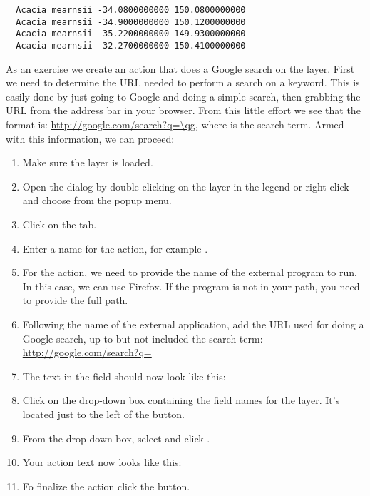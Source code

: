 \begin{verbatim}
  Acacia mearnsii -34.0800000000 150.0800000000
  Acacia mearnsii -34.9000000000 150.1200000000
  Acacia mearnsii -35.2200000000 149.9300000000
  Acacia mearnsii -32.2700000000 150.4100000000
\end{verbatim} 

As an exercise we create an action that does a Google search on the 
 layer. First we need to determine the URL needed to perform a search on a
keyword. This is easily done by just going to Google and doing a simple
search, then grabbing the URL from the address bar in your browser. From this
little effort we see that the format is: \url{http://google.com/search?q=\qg},
where \usertext{\qg} is the search term. Armed with this information, we can
proceed:

\begin{enumerate}
\item Make sure the  layer is loaded.
\item Open the  dialog by double-clicking on the layer in the
  legend or right-click and choose  from the popup menu.
\item Click on the  tab.
\item Enter a name for the action, for example .
\item For the action, we need to provide the name of the external program to
  run. In this case, we can use Firefox. If the program is not in
  your path, you need to provide the full path.
\item Following the name of the external application, add the URL used for
  doing a Google search, up to but not included the search term:
  \url{http://google.com/search?q=}
\item The text in the  field should now look like this:\\
\item Click on the drop-down box containing the field names for the
   layer. It's located just to the left of the
   button.
\item From the drop-down box, select  and click .
\item Your action text now looks like this:\\ 
\item Fo finalize the action click the  button.
\end{enumerate}
 
